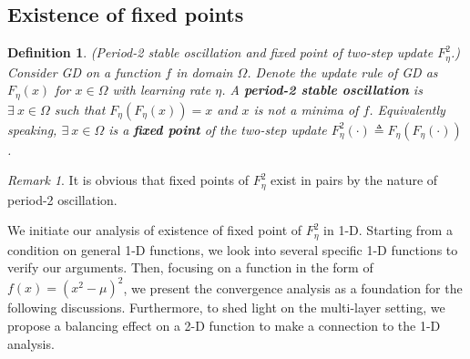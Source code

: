 \documentclass{article}
\theoremstyle{plain}
\newtheorem{defi}{Definition}
\theoremstyle{remark}
\newtheorem*{remark}{Remark}
\begin{document}
\subsection{Existence of fixed points}
\begin{defi}
    (Period-2 stable oscillation and fixed point of two-step update $F^2_\eta$.) Consider GD on a function $f$ in domain $\Omega$. Denote the update rule of GD as $F_\eta(x)$ for $x\in\Omega$ with learning rate $\eta$. A \textbf{period-2 stable oscillation} is $\exists~x\in\Omega$ such that $F_\eta(F_\eta(x))=x$ and $x$ is not a minima of $f$. Equivalently speaking, $\exists~x\in\Omega$ is a \textbf{fixed point} of the two-step update $F^2_\eta(\cdot)\triangleq F_\eta(F_\eta(\cdot))$.
\end{defi}

\begin{remark}
    It is obvious that fixed points of $F^2_\eta$ exist in pairs by the nature of period-2 oscillation.
\end{remark}

We initiate our analysis of existence of fixed point of $F^2_\eta$ in 1-D. Starting from a condition on general 1-D functions, we look into several specific 1-D functions to verify our arguments. 
Then, focusing on a function in the form of $f(x)=(x^2-\mu)^2$, we present the convergence analysis as a foundation for the following discussions. Furthermore, to shed light on the multi-layer setting, we propose a balancing effect on a 2-D function to make a connection to the 1-D analysis.

\label{sec:1d}
\end{document}
